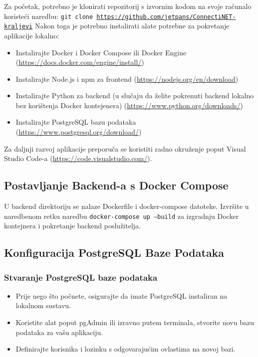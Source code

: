 			Za početak, potrebno je klonirati repozitorij s izvornim kodom na svoje računalo koristeći naredbu:
			\texttt{git clone \url{https://github.com/jetpans/ConnectiNET-kraljevi}} 
			Nakon toga je potrebno instalirati alate potrebne za pokretanje aplikacije lokalno:
			
			\begin{itemize}
					\item Instalirajte Docker i Docker Compose ili Docker Engine (\url{https://docs.docker.com/engine/install/})
					\item Instalirajte Node.js i npm za frontend (\url{https://nodejs.org/en/download})
					\item Instalirajte Python za backend (u slučaju da želite pokrenuti backend lokalno bez korištenja Docker kontejenera) (\url{https://www.python.org/downloads/})
					\item Instalirajte PostgreSQL bazu podataka (\url{https://www.postgresql.org/download/})
			\end{itemize}
			
			Za daljnji razvoj aplikacije preporuča se koristiti radno okruženje poput Visual Studio Code-a (\url{https://code.visualstudio.com/}). 
			
			\subsection{Postavljanje Backend-a s Docker Compose}
			
			U backend direktoriju se nalaze Dockerfile i docker-compose datoteke. Izvršite u naredbenom retku naredbu 
			\texttt{docker-compose up --build} 
			za izgradnju Docker kontejnera i pokretanje backend poslužitelja.
			
			\subsection{Konfiguracija PostgreSQL Baze Podataka}
			
			\subsubsection{Stvaranje PostgreSQL baze podataka}
			
			\begin{itemize}
					\item Prije nego što počnete, osigurajte da imate PostgreSQL instaliran na lokalnom sustavu.
					\item Koristite alat poput pgAdmin ili izravno putem terminala, stvorite novu bazu podataka za vašu aplikaciju.
					\item Definirajte korisnika i lozinku s odgovarajućim ovlastima na novoj bazi.
			\end{itemize}
			
